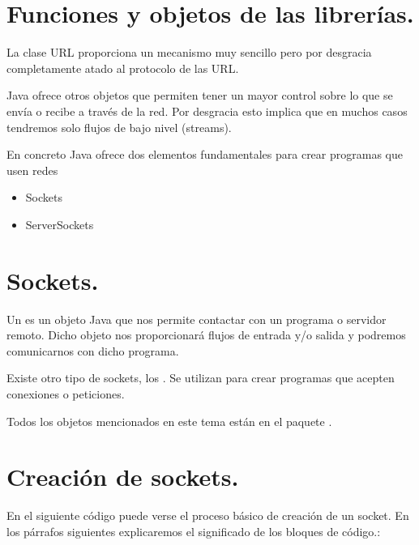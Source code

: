 \documentclass[letterpaper,10pt,spanish]{sphinxmanual}
\begin{document}
\section{Funciones y objetos de las librerías.}
\label{\detokenize{textos/tema3:funciones-y-objetos-de-las-librerias}}
La clase URL proporciona un mecanismo muy sencillo pero por desgracia completamente atado al protocolo de las URL.

Java ofrece otros objetos que permiten tener un mayor control sobre lo que se envía o recibe a través de la red. Por desgracia esto implica que en muchos casos tendremos solo flujos de bajo nivel (streams).

En concreto Java ofrece dos elementos fundamentales para crear programas que usen redes
\begin{itemize}
\item {} 
Sockets

\item {} 
ServerSockets

\end{itemize}


\section{Sockets.}
\label{\detokenize{textos/tema3:sockets}}
Un  es un objeto Java que nos permite contactar con un programa o servidor remoto. Dicho objeto nos proporcionará flujos de entrada y/o salida y podremos comunicarnos con dicho programa.

Existe otro tipo de sockets, los . Se utilizan para crear programas que acepten conexiones o peticiones.

Todos los objetos mencionados en este tema están en el paquete .


\section{Creación de sockets.}
\label{\detokenize{textos/tema3:creacion-de-sockets}}
En el siguiente código puede verse el proceso básico de creación de un socket. En los párrafos siguientes explicaremos el significado de los bloques de código.:
\end{document}

